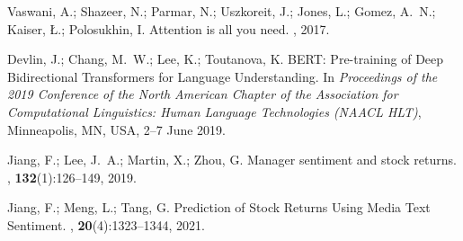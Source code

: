 \documentclass[12pt]{article}
\begin{document}

\begin{thebibliography}{100}

Vaswani, A.; Shazeer, N.; Parmar, N.; Uszkoreit, J.; Jones, L.; Gomez, A.~N.; Kaiser, {\L}.; Polosukhin, I. 
\newblock Attention is all you need.
, 2017.

Devlin, J.; Chang, M.~W.; Lee, K.; Toutanova, K.
\newblock BERT: Pre-training of Deep Bidirectional Transformers for Language Understanding.
\newblock In {\em Proceedings of the 2019 Conference of the North American Chapter of the Association for Computational Linguistics: Human Language Technologies (NAACL HLT)}, Minneapolis, MN, USA, 2--7 June 2019.

Jiang, F.; Lee, J.~A.; Martin, X.; Zhou, G.
\newblock Manager sentiment and stock returns.
, \textbf{132}(1):126--149, 2019.

Jiang, F.; Meng, L.; Tang, G.
\newblock Prediction of Stock Returns Using Media Text Sentiment.
, \textbf{20}(4):1323--1344, 2021.

\end{thebibliography}
\end{document}
